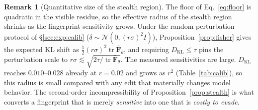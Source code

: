 \documentclass[11pt]{article}
\theoremstyle{definition}
\newtheorem{remark}{Remark}
\begin{document}
\begin{remark}[Quantitative size of the stealth region]
\label{rem:advscale}
The floor of Eq.~\eqref{eq:floor} is quadratic in the visible residue, so the
effective radius of the stealth region shrinks as the fingerprint sensitivity
grows. Under the random-perturbation protocol of \S\ref{sec:exp:calib}
($\delta \sim \mathcal{N}(0, (r\sigma)^2 I)$),
Proposition~\ref{prop:fisher} gives the expected KL shift as
$\tfrac12 (r\sigma)^2 \operatorname{tr}\bar{\bm{F}}_\theta$, and requiring
$D_{\mathrm{KL}} \le \tau$ pins the perturbation scale to
$r\sigma \lesssim \sqrt{2\tau \big/ \operatorname{tr}\bar{\bm{F}}_\theta}$.
The measured sensitivities are large. $D_{\mathrm{KL}}$ reaches
$0.010$--$0.028$ already at $r = 0.02$ and grows as $r^2$
(Table~\ref{tab:calib}), so this radius is small compared with any edit that
materially changes model behavior. The second-order incompressibility of
Proposition~\ref{prop:stealth} is what converts a fingerprint that is merely
\emph{sensitive} into one that is \emph{costly to evade}.
\end{remark}


\end{document}
